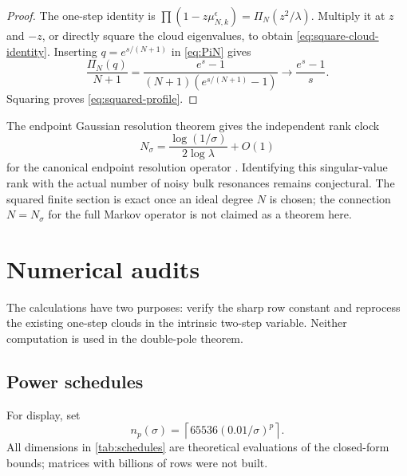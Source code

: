 \documentclass[11pt]{article}
\theoremstyle{definition}
\theoremstyle{remark}
\begin{document}
\begin{proof}
The one-step identity is
$\prod(1-z\mu_{N,k}^{\epsilon})=\Pi_N(z^2/\lambda)$.
Multiply it at $z$ and $-z$, or directly square the cloud eigenvalues, to
obtain \eqref{eq:square-cloud-identity}.  Inserting
$q=e^{s/(N+1)}$ in \eqref{eq:PiN} gives
\[
 \frac{\Pi_N(q)}{N+1}
 =\frac{e^s-1}{(N+1)(e^{s/(N+1)}-1)}
 \longrightarrow\frac{e^s-1}{s}.
\]
Squaring proves \eqref{eq:squared-profile}.
\end{proof}

The endpoint Gaussian resolution theorem gives the independent rank clock
\begin{equation}
 N_\sigma
 =\frac{\log(1/\sigma)}{2\log\lambda}+O(1)
 \label{eq:rank-clock}
\end{equation}
for the canonical endpoint resolution operator
\citep{WangEndpointRank2026}.  Identifying this singular-value rank with the
actual number of noisy bulk resonances remains conjectural.  The squared
finite section is exact once an ideal degree $N$ is chosen; the connection
$N=N_\sigma$ for the full Markov operator is not claimed as a theorem here.

\section{Numerical audits}
\label{sec:numerics}

The calculations have two purposes: verify the sharp row constant and
reprocess the existing one-step clouds in the intrinsic two-step variable.
Neither computation is used in the double-pole theorem.

\subsection{Power schedules}

For display, set
\begin{equation}
 n_p(\sigma)
 =\left\lceil65536(0.01/\sigma)^p\right\rceil.
 \label{eq:display-schedule}
\end{equation}
All dimensions in \cref{tab:schedules} are theoretical evaluations of the
closed-form bounds; matrices with billions of rows were not built.
\end{document}
